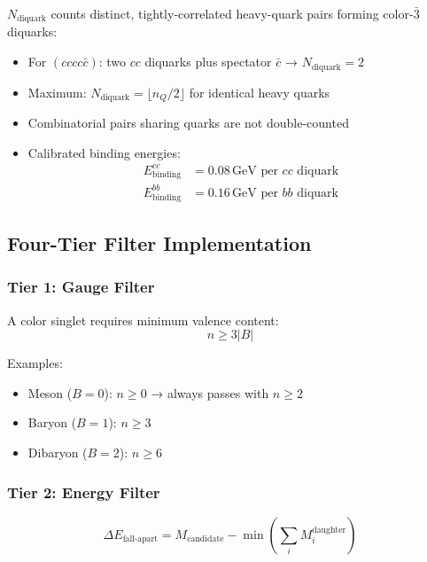 \documentclass[12pt,a4paper]{article}
\begin{document}
$N_{\text{diquark}}$ counts distinct, tightly-correlated heavy-quark pairs forming color-$\bar{3}$ diquarks:

\begin{itemize}
\item For $(cccc\bar{c})$: two $cc$ diquarks plus spectator $\bar{c}$ → $N_{\text{diquark}} = 2$
\item Maximum: $N_{\text{diquark}} = \lfloor n_Q/2 \rfloor$ for identical heavy quarks
\item Combinatorial pairs sharing quarks are not double-counted
\item Calibrated binding energies:
\begin{align}
E_{\text{binding}}^{cc} &= 0.08\,\text{GeV per }cc\text{ diquark} \\
E_{\text{binding}}^{bb} &= 0.16\,\text{GeV per }bb\text{ diquark}
\end{align}
\end{itemize}

\subsection{Four-Tier Filter Implementation}

\subsubsection{Tier 1: Gauge Filter}

A color singlet requires minimum valence content:
\begin{equation}
n \geq 3|B|
\end{equation}

Examples:
\begin{itemize}
\item Meson ($B=0$): $n \geq 0$ → always passes with $n \geq 2$
\item Baryon ($B=1$): $n \geq 3$
\item Dibaryon ($B=2$): $n \geq 6$
\end{itemize}

\subsubsection{Tier 2: Energy Filter}

\begin{equation}
\Delta E_{\text{fall-apart}} = M_{\text{candidate}} - \min\left(\sum_i M_i^{\text{daughter}}\right)
\end{equation}
\end{document}
